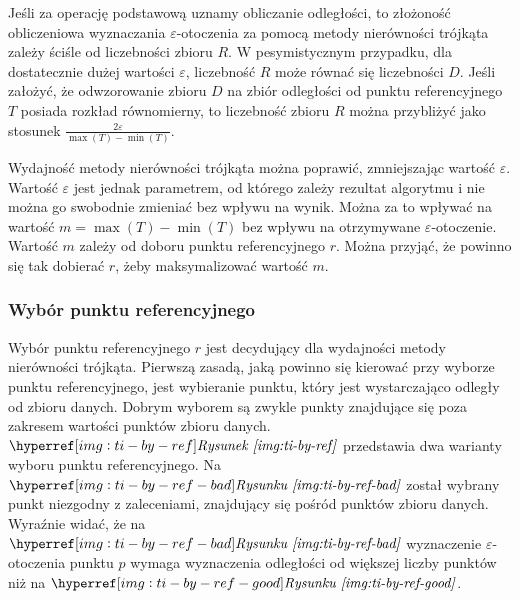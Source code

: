 Jeśli za operację podstawową uznamy obliczanie odległości, to złożoność obliczeniowa wyznaczania $ \varepsilon $-otoczenia za pomocą metody nierówności trójkąta zależy ściśle od liczebności zbioru $ R $. W pesymistycznym przypadku, dla dostatecznie dużej wartości $ \varepsilon $, liczebność $ R $ może równać się liczebności $ D $. Jeśli założyć, że odwzorowanie zbioru $ D $ na zbiór odległości od punktu referencyjnego $ T $ posiada rozkład równomierny, to liczebność zbioru $ R $ można przybliżyć jako stosunek $ \frac{2\varepsilon}{\max(T)-\min(T)} $. 

Wydajność metody nierówności trójkąta można poprawić, zmniejszając wartość $ \varepsilon $. Wartość $ \varepsilon $ jest jednak parametrem, od którego zależy rezultat algorytmu i nie można go swobodnie zmieniać bez wpływu na wynik. Można za to wpływać na wartość $ m=\max(T)-\min(T) $ bez wpływu na otrzymywane $ \varepsilon $-otoczenie. Wartość $ m $ zależy od doboru punktu referencyjnego $ r $. Można przyjąć, że powinno się tak dobierać $ r $, żeby maksymalizować wartość $ m $. 

\subsubsection{Wybór punktu referencyjnego}
Wybór punktu referencyjnego  $ r $ jest decydujący dla wydajności metody nierówności trójkąta. Pierwszą zasadą, jaką powinno się kierować przy wyborze punktu referencyjnego, jest wybieranie punktu, który jest wystarczająco odległy od zbioru danych. Dobrym wyborem są zwykle punkty znajdujące się poza zakresem wartości punktów zbioru danych. $ \myhyperref{img:ti-by-ref}{Rysunek} $ przedstawia dwa warianty wyboru punktu referencyjnego. Na $ \myhyperref{img:ti-by-ref-bad}{Rysunku} $ został wybrany punkt niezgodny z zaleceniami, znajdujący się pośród punktów zbioru danych. Wyraźnie widać, że na $ \myhyperref{img:ti-by-ref-bad}{Rysunku} $ wyznaczenie $ \varepsilon $-otoczenia punktu $ p $ wymaga wyznaczenia odległości od większej liczby punktów niż na $ \myhyperref{img:ti-by-ref-good}{Rysunku} $.

